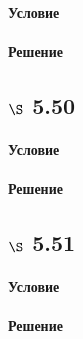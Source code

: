 \documentclass[a4paper,12pt]{article}
\begin{document}
\paragraph*{Условие}
\paragraph*{Решение}

\subsection*{$\S$ 5.50}
\paragraph*{Условие}
\paragraph*{Решение}

\subsection*{$\S$ 5.51}
\paragraph*{Условие}
\paragraph*{Решение}
\end{document}
